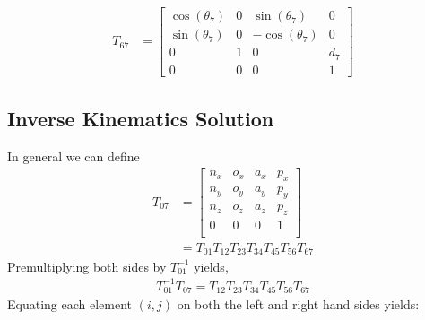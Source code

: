 \documentclass[onecolumn,10pt]{jhwhw}
\begin{document}
\begin{align*}
T_{67} &=
\left[\begin{matrix}\cos{\left (\theta_{7} \right )} & 0 & \sin{\left (\theta_{7} \right )} & 0\\\sin{\left (\theta_{7} \right )} & 0 & - \cos{\left (\theta_{7} \right )} & 0\\0 & 1 & 0 & d_{7}\\0 & 0 & 0 & 1\end{matrix}\right]
\end{align*}


\subsection{Inverse Kinematics Solution}
In general we can define
\begin{align*}
T_{07} &=
\left[\begin{matrix}
n_x & o_x & a_x & p_x \\
n_y & o_y & a_y & p_y \\
n_z & o_z & a_z & p_z \\
  0 &   0 &   0 &   1 \\
\end{matrix}\right]\\
&= T_{01} T_{12} T_{23} T_{34} T_{45} T_{56} T_{67}
\end{align*}
Premultiplying both sides by $T_{01}^{-1}$ yields,
\begin{align*}
T_{01}^{-1} T_{07} = T_{12} T_{23} T_{34} T_{45} T_{56} T_{67}
\end{align*}
Equating each element $(i,j)$ on both the left and right hand sides yields:
\end{document}
